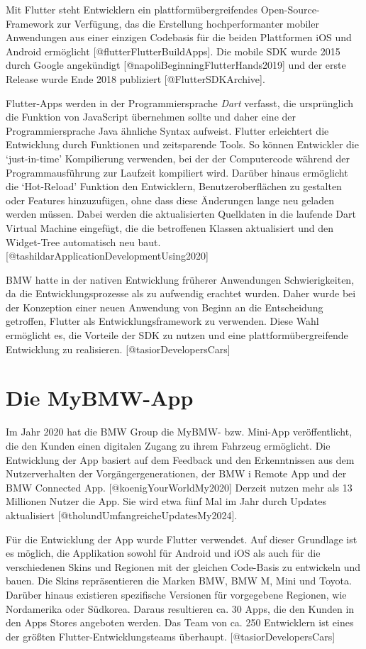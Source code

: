 \documentclass[
  12pt,
  a4paperpaper,
]{report}
\begin{document}
Mit Flutter steht Entwicklern ein plattformübergreifendes
Open-Source-Framework zur Verfügung, das die Erstellung hochperformanter
mobiler Anwendungen aus einer einzigen Codebasis für die beiden
Plattformen iOS und Android ermöglicht {[}@flutterFlutterBuildApps{]}.
Die mobile SDK wurde 2015 durch Google angekündigt
{[}@napoliBeginningFlutterHands2019{]} und der erste Release wurde Ende
2018 publiziert {[}@FlutterSDKArchive{]}.

Flutter-Apps werden in der Programmiersprache \emph{Dart} verfasst, die
ursprünglich die Funktion von JavaScript übernehmen sollte und daher
eine der Programmiersprache Java ähnliche Syntax aufweist. Flutter
erleichtert die Entwicklung durch Funktionen und zeitsparende Tools. So
können Entwickler die `just-in-time' Kompilierung verwenden, bei der der
Computercode während der Programmausführung zur Laufzeit kompiliert
wird. Darüber hinaus ermöglicht die `Hot-Reload' Funktion den
Entwicklern, Benutzeroberflächen zu gestalten oder Features
hinzuzufügen, ohne dass diese Änderungen lange neu geladen werden
müssen. Dabei werden die aktualisierten Quelldaten in die laufende Dart
Virtual Machine eingefügt, die die betroffenen Klassen aktualisiert und
den Widget-Tree automatisch neu baut.
{[}@tashildarApplicationDevelopmentUsing2020{]}

BMW hatte in der nativen Entwicklung früherer Anwendungen
Schwierigkeiten, da die Entwicklungsprozesse als zu aufwendig erachtet
wurden. Daher wurde bei der Konzeption einer neuen Anwendung von Beginn
an die Entscheidung getroffen, Flutter als Entwicklungsframework zu
verwenden. Diese Wahl ermöglicht es, die Vorteile der SDK zu nutzen und
eine plattformübergreifende Entwicklung zu realisieren.
{[}@tasiorDevelopersCars{]}

\section{Die MyBMW-App}\label{die-mybmw-app}

Im Jahr 2020 hat die BMW Group die MyBMW- bzw. Mini-App veröffentlicht,
die den Kunden einen digitalen Zugang zu ihrem Fahrzeug ermöglicht. Die
Entwicklung der App basiert auf dem Feedback und den Erkenntnissen aus
dem Nutzerverhalten der Vorgängergenerationen, der BMW i Remote App und
der BMW Connected App. {[}@koenigYourWorldMy2020{]} Derzeit nutzen mehr
als 13 Millionen Nutzer die App. Sie wird etwa fünf Mal im Jahr durch
Updates aktualisiert {[}@tholundUmfangreicheUpdatesMy2024{]}.

Für die Entwicklung der App wurde Flutter verwendet. Auf dieser
Grundlage ist es möglich, die Applikation sowohl für Android und iOS als
auch für die verschiedenen Skins und Regionen mit der gleichen
Code-Basis zu entwickeln und bauen. Die Skins repräsentieren die Marken
BMW, BMW M, Mini und Toyota. Darüber hinaus existieren spezifische
Versionen für vorgegebene Regionen, wie Nordamerika oder Südkorea.
Daraus resultieren ca. 30 Apps, die den Kunden in den Apps Stores
angeboten werden. Das Team von ca. 250 Entwicklern ist eines der größten
Flutter-Entwicklungsteams überhaupt. {[}@tasiorDevelopersCars{]}
\end{document}
